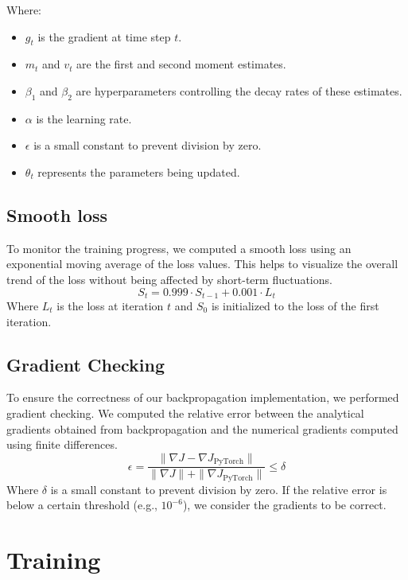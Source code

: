 \documentclass{article}
\begin{document}
Where:
\begin{itemize}
    \item \( g_t \) is the gradient at time step \( t \).
    \item \( m_t \) and \( v_t \) are the first and second moment estimates.
    \item \( \beta_1 \) and \( \beta_2 \) are hyperparameters controlling the decay rates of these estimates.
    \item \( \alpha \) is the learning rate.
    \item \( \epsilon \) is a small constant to prevent division by zero.
    \item \( \theta_t \) represents the parameters being updated.
\end{itemize}


\subsection{Smooth loss}
To monitor the training progress, we computed a smooth loss using an exponential moving average of the loss values. This helps to visualize the overall trend of the loss without being affected by short-term fluctuations.
\begin{equation}
    S_t = 0.999 \cdot S_{t-1} + 0.001 \cdot L_t
\end{equation}
Where \( L_t \) is the loss at iteration \( t \) and \( S_0 \) is initialized to the loss of the first iteration.

\subsection{Gradient Checking}

To ensure the correctness of our backpropagation implementation, we performed gradient checking. We computed the relative error between the analytical gradients obtained from backpropagation and the numerical gradients computed using finite differences.
\begin{equation}
    \epsilon = \frac{\| \nabla J - \nabla J_{\text{PyTorch}} \|}{\| \nabla J \| + \| \nabla J_{\text{PyTorch}} \|} \leq \delta
\end{equation}
Where \( \delta \) is a small constant to prevent division by zero. If the relative error is below a certain threshold (e.g., \( 10^{-6} \)), we consider the gradients to be correct.


\section{Training}
\end{document}
